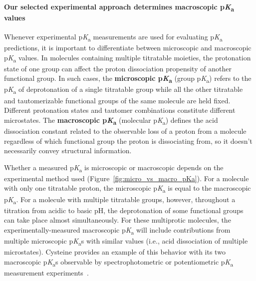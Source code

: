 \documentclass[9pt,lineno]{elife}
\newcommand{\pKa}{p\textit{K}\textsubscript{a}}
\begin{document}
\paragraph{Our selected experimental approach determines macroscopic \pKa{} values}

Whenever experimental \pKa{} measurements are used for evaluating \pKa{} predictions, it is important to differentiate between microscopic and macroscopic \pKa{} values. 
In molecules containing multiple titratable moieties, the protonation state of one group can affect the proton dissociation propensity of another functional group.
In such cases, the \textbf{microscopic \pKa} (group \pKa) refers to the \pKa{} of deprotonation of a single titratable group while all the other titratable and tautomerizable functional groups of the same molecule are held fixed. 
Different protonation states and tautomer combinations constitute different microstates. 
The \textbf{macroscopic \pKa} (molecular \pKa) defines the acid dissociation constant related to the observable loss of a proton from a molecule regardless of which functional group the proton is dissociating from, so it doesn't necessarily convey structural information. 

Whether a measured \pKa{} is microscopic or macroscopic depends on the experimental method used (Figure~\ref{fig:micro_vs_macro_pKa}). 
For a molecule with only one titratable proton, the microscopic \pKa{} is equal to the macroscopic \pKa{}. 
For a molecule with multiple titratable groups, however, throughout a titration from acidic to basic pH, the deprotonation of some functional groups can take place almost simultaneously. 
For these multiprotic molecules, the experimentally-measured macroscopic \pKa{} will include contributions from multiple microscopic \pKa{}s with similar values (i.e., acid dissociation of multiple microstates). 
Cysteine provides an example of this behavior with its two macroscopic \pKa{}s observable by spectrophotometric or potentiometric \pKa{} measurement experiments~\citep{bodner_assigning_1986,darvey_assignment_1995}. 
\end{document}
